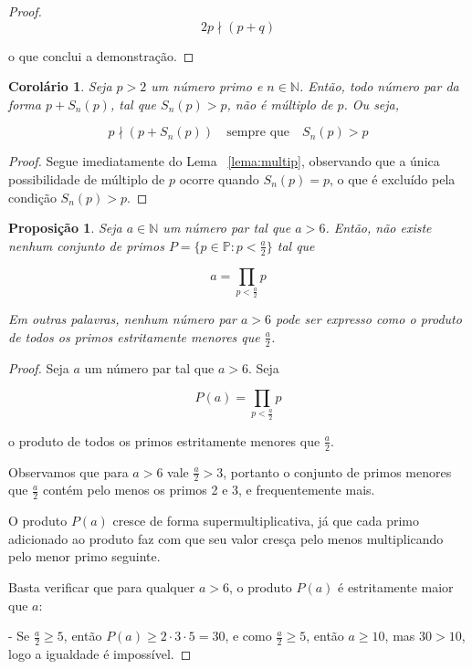 \documentclass[a4paper,11pt]{article}
\newtheorem{proposition}[theorem]{Proposição}
\newtheorem{corollary}[theorem]{Corolário}
\theoremstyle{definition}
\theoremstyle{remark}
\begin{document}
\begin{otherlanguage}{brazil}
\begin{proof}
		\[
		2p \nmid (p + q)
		\]
		
		o que conclui a demonstração.
	\end{proof}
	
	\begin{corollary}
		Seja \(p > 2\) um número primo e \(n \in \mathbb{N}\). Então, todo número par da forma \(p + S_n(p)\), tal que \(S_n(p) > p\), não é múltiplo de \(p\). Ou seja,
		
		\[
		p \nmid (p + S_n(p)) \quad \text{sempre que} \quad S_n(p) > p
		\]
		
	\end{corollary}
	
	\begin{proof}
		Segue imediatamente do Lema ~\ref{lema:multip}, observando que a única possibilidade de múltiplo de \(p\) ocorre quando \(S_n(p) = p\), o que é excluído pela condição \(S_n(p) > p\).
	\end{proof}
	
	
	\begin{proposition}
		Seja \(a \in \mathbb{N}\) um número par tal que \(a > 6\). Então, não existe nenhum conjunto de primos \(P = \{p \in \mathbb{P} : p < \frac{a}{2}\}\) tal que
		
		\[
		a = \prod_{p < \frac{a}{2}} p
		\]
		
		Em outras palavras, nenhum número par \(a > 6\) pode ser expresso como o produto de todos os primos estritamente menores que \(\frac{a}{2}\).
	\end{proposition}
	
	\begin{proof}
		Seja \(a\) um número par tal que \(a > 6\). Seja
		
		\[
		P(a) = \prod_{p < \frac{a}{2}} p
		\]
		
		o produto de todos os primos estritamente menores que \(\frac{a}{2}\).
		
		Observamos que para \(a > 6\) vale \(\frac{a}{2} > 3\), portanto o conjunto de primos menores que \(\frac{a}{2}\) contém pelo menos os primos 2 e 3, e frequentemente mais.
		
		O produto \(P(a)\) cresce de forma supermultiplicativa, já que cada primo adicionado ao produto faz com que seu valor cresça pelo menos multiplicando pelo menor primo seguinte.
		
		Basta verificar que para qualquer \(a > 6\), o produto \(P(a)\) é estritamente maior que \(a\):
		
		- Se \(\frac{a}{2} \geq 5\), então \(P(a) \geq 2 \cdot 3 \cdot 5 = 30\), e como \(\frac{a}{2} \geq 5\), então \(a \geq 10\), mas \(30 > 10\), logo a igualdade é impossível.
		

\end{proof}
\end{otherlanguage}
\end{document}
